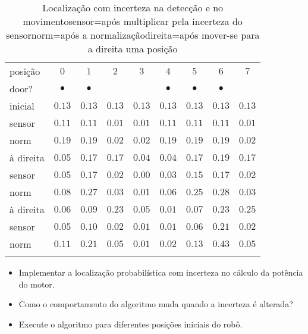 \begin{table}
\caption[Localização com incerteza na detecção e no movimento]{Localização com incerteza na detecção e no movimento\newline{}sensor=após multiplicar pela incerteza do sensor\newline{}norm=após a normalização\newline{}direita=após mover-se para a direita uma posição}\label{tab.uncertain-sensing-motion}
\setlength{\tabcolsep}{6pt}
\begin{tabular}{l|rrrrrrrr}
\hline\noalign{\smallskip}
posição&\multicolumn{1}{c}{$0$}&\multicolumn{1}{c}{$1$}&\multicolumn{1}{c}{$2$}&\multicolumn{1}{c}{$3$}&\multicolumn{1}{c}{$4$}&\multicolumn{1}{c}{$5$}&\multicolumn{1}{c}{$6$}&\multicolumn{1}{c}{$7$}\\
door?&\multicolumn{1}{c}{$\bullet$}&\multicolumn{1}{c}{$\bullet$}&&&\multicolumn{1}{c}{$\bullet$}&\multicolumn{1}{c}{$\bullet$}&\multicolumn{1}{c}{$\bullet$}&\\
\hline\noalign{\smallskip}
inicial  & $0.13$ & $0.13$ & $0.13$ & $0.13$ & $0.13$ & $0.13$ & $0.13$ & $0.13$\\
sensor & $0.11$ & $0.11$ & $0.01$ & $0.01$ & $0.11$ & $0.11$ & $0.11$ & $0.01$\\
norm     & $0.19$ & $0.19$ & $0.02$ & $0.02$ & $0.19$ & $0.19$ & $0.19$ & $0.02$\\
\hline
à direita    & $0.05$ & $0.17$ & $0.17$ & $0.04$ & $0.04$ & $0.17$ & $0.19$ & $0.17$\\
sensor & $0.05$ & $0.17$ & $0.02$ & $0.00$ & $0.03$ & $0.15$ & $0.17$ & $0.02$\\
norm     & $0.08$ & $0.27$ & $0.03$ & $0.01$ & $0.06$ & $0.25$ & $0.28$ & $0.03$\\
\hline
à direita    & $0.06$ & $0.09$ & $0.23$ & $0.05$ & $0.01$ & $0.07$ & $0.23$ & $0.25$\\
sensor & $0.05$ & $0.10$ & $0.02$ & $0.01$ & $0.01$ & $0.06$ & $0.21$ & $0.02$\\
norm     & $0.11$ & $0.21$ & $0.05$ & $0.01$ & $0.02$ & $0.13$ & $0.43$ & $0.05$\\
\noalign{\smallskip}\hline\noalign{\smallskip}
\end{tabular}
\end{table}

\begin{framed}
\begin{itemize}
\item Implementar a localização probabilística com incerteza no cálculo da potência do motor.
\item Como o comportamento do algoritmo muda quando a incerteza é alterada?
\item Execute o algoritmo para diferentes posições iniciais do robô.
\end{itemize}
\end{framed}

